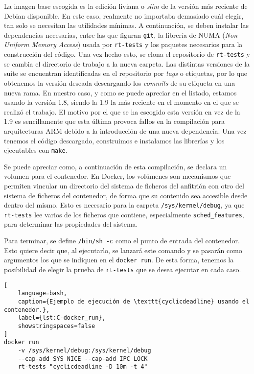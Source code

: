 La imagen base escogida es la edición liviana o \textit{slim} de la versión más
reciente de Debian disponible. En este caso, realmente no importaba demasiado
cuál elegir, tan solo se necesitan las utilidades mínimas. A continuación, se
deben instalar las dependencias necesarias, entre las que figuran \texttt{git},
la librería de NUMA (\textit{Non Uniform Memory Access}) usada por
\texttt{rt-tests} y los paquetes necesarios para la construcción del código. Una
vez hecho esto, se clona el repositorio de \texttt{rt-tests} y se cambia el
directorio de trabajo a la nueva carpeta. Las distintas versiones de la suite se
encuentran identificadas en el repositorio por \textit{tags} o etiquetas, por lo
que obtenemos la versión deseada descargando los \textit{commits} de su etiqueta
en una nueva rama. En nuestro caso, y como se puede apreciar en el listado,
estamos usando la versión 1.8, siendo la 1.9 la más reciente en el momento en el
que se realizó el trabajo. El motivo por el que se ha escogido esta versión en
vez de la 1.9 es sencillamente que esta última provoca fallos en la compilación
para arquitecturas ARM debido a la introducción de una nueva dependencia. Una
vez tenemos el código descargado, construimos e instalamos las librerías y los
ejecutables con \texttt{make}.

Se puede apreciar como, a continuación de esta compilación, se declara un
volumen para el contenedor. En Docker, los volúmenes son mecanismos que permiten
vincular un directorio del sistema de ficheros del anfitrión con otro del
sistema de ficheros del contenedor, de forma que su contenido sea accesible
desde dentro del mismo. Esto es necesario para la carpeta
\texttt{/sys/kernel/debug}, ya que \texttt{rt-tests} lee varios de los ficheros
que contiene, especialmente \texttt{sched\_features}, para determinar las
propiedades del sistema.

Para terminar, se define \lstinline{/bin/sh -c} como el punto de entrada del
contenedor. Esto quiere decir que, al ejecutarlo, se lanzará este comando y se
pasarán como argumentos los que se indiquen en el \lstinline{docker run}. De
esta forma, tenemos la posibilidad de elegir la prueba de \texttt{rt-tests} que
se desea ejecutar en cada caso.

\begin{lstlisting}[
    language=bash,
    caption={Ejemplo de ejecución de \texttt{cyclicdeadline} usando el contenedor.},
    label={lst:C-docker_run},
    showstringspaces=false
]
docker run
    -v /sys/kernel/debug:/sys/kernel/debug
    --cap-add SYS_NICE --cap-add IPC_LOCK
    rt-tests "cyclicdeadline -D 10m -t 4"
\end{lstlisting}

